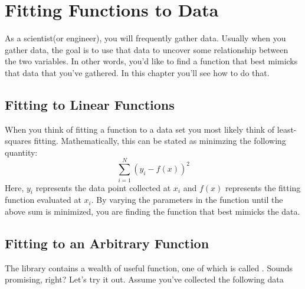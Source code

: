 \chapter{Fitting Functions to Data}
\label{chap:Fitting}

As a scientist(or engineer), you will frequently gather data.  Usually
when you gather data, the goal is to use that data to uncover some
relationship between the two variables.  In other words, you'd like to
find a function that best mimicks that data that you've gathered.  In
this chapter you'll see how to do that.

\section{Fitting to Linear Functions}
When you think of fitting a function to a data set you most likely
think of least-squares fitting.  Mathematically, this can be stated
as minimzing the following quantity:
\begin{equation}
\sum_{i=1}^N (y_i - f(x))^2
\end{equation}
Here, $y_i$ represents the data point collected at $x_i$ and $f(x)$ represents
the fitting function evaluated at $x_i$.  By varying the parameters in
the function until the above sum is minimized, you are finding the
function that best mimicks the data.

\section{Fitting to an Arbitrary Function}
The  library contains a wealth of useful function, one
of which is called .  Sounds promising, right?
Let's try it out.  Assume you've collected the following data

